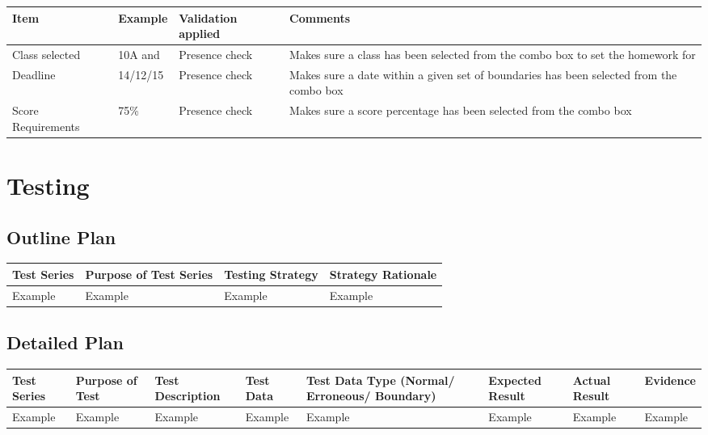 \begin{center}
\begin{tabular}{|p{2cm}|p{3cm}|p{4cm}|p{4cm}|} \hline
\textbf{Item} & \textbf{Example} & \textbf{Validation applied} & \textbf{Comments} \\ \hline
Class selected & 10A and & Presence check & Makes sure a class has been selected from the combo box to set the homework for \\ \hline
Deadline & 14/12/15 & Presence check & Makes sure a date within a given set of boundaries has been selected from the combo box \\ \hline
Score Requirements & 75\% & Presence check & Makes sure a score percentage has been selected from the combo box \\ \hline
\end{tabular}
\end{center}

\section{Testing}

\begin{landscape}
\subsection{Outline Plan}

\begin{center}
    \begin{tabular}{|p{2cm}|p{5cm}|p{5cm}|p{4cm}|}
        \hline
        \textbf{Test Series} & \textbf{Purpose of Test Series} & \textbf{Testing Strategy} & \textbf{Strategy Rationale}\\ \hline
        Example & Example & Example & Example \\ \hline
    \end{tabular}
\end{center}

\subsection{Detailed Plan}

\begin{center}
    \begin{longtable}{|p{1.5cm}|p{2.5cm}|p{2.5cm}|p{2cm}|p{2cm}|p{2cm}|p{2cm}|p{2cm}|}
        \hline
        \textbf{Test Series} & \textbf{Purpose of Test} & \textbf{Test Description} & \textbf{Test Data} & \textbf{Test Data Type (Normal/ Erroneous/ Boundary)} & \textbf{Expected Result} & \textbf{Actual Result} & \textbf{Evidence}\\ \hline
        Example & Example & Example & Example & Example & Example & Example & Example \\ \hline
    \end{longtable}
\end{center}
\end{landscape}